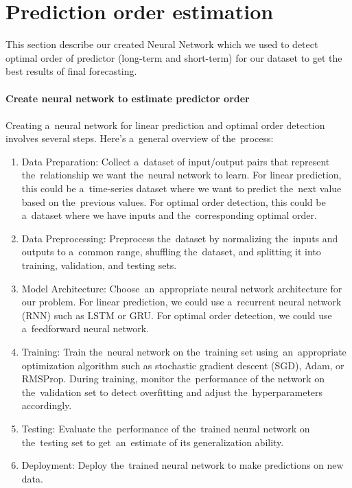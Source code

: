     \section{Prediction order estimation}\label{sec:ordercalc}
        This section describe our created Neural Network which we used to detect optimal order of predictor (long-term and short-term) for our dataset to get the best results of final forecasting.\\
        \\
        \textbf{Create neural network to estimate predictor order}\\
        \\
        Creating a~neural network for linear prediction and optimal order detection involves several steps.
        Here's a~general overview of the~process:
        \begin{enumerate}
            \item Data Preparation: Collect a~dataset of input/output pairs that represent the~relationship we want
            the~neural network to learn. For linear prediction, this could be a~time-series dataset where we want to
            predict the~next value based on the~previous values. For optimal order detection, this could be a~dataset
            where we have inputs and the~corresponding optimal order.
            \item Data Preprocessing: Preprocess the~dataset by normalizing the~inputs and outputs to a~common range,
            shuffling the~dataset, and splitting it into training, validation, and testing sets.
            \item Model Architecture: Choose~an~appropriate neural network architecture for our problem. For linear
            prediction, we could use a~recurrent neural network (RNN) such as LSTM or GRU. For optimal order
            detection, we could use a~feedforward neural network.
            \item Training: Train the~neural network on the~training set using~an~appropriate optimization algorithm
            such as stochastic gradient descent (SGD), Adam, or RMSProp. During training, monitor the~performance of the
            network on the~validation set to detect overfitting and adjust the~hyperparameters accordingly.
            \item Testing: Evaluate the~performance of the~trained neural network on the~testing set
            to get~an~estimate of its generalization ability.
            \item Deployment: Deploy the~trained neural network to make predictions on new data.
        \end{enumerate}
